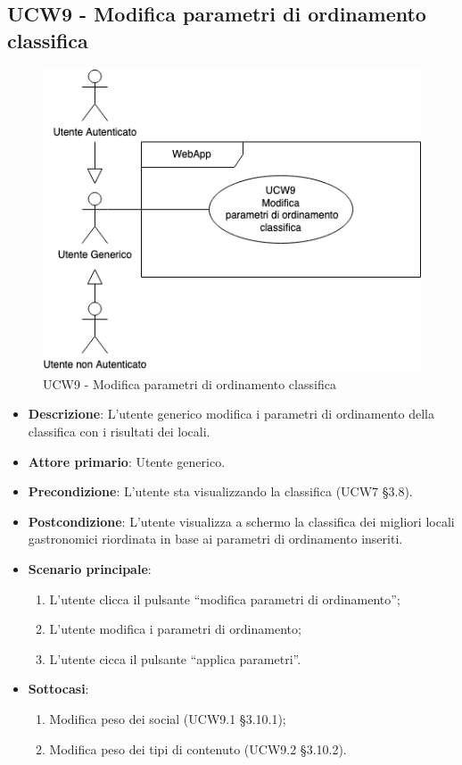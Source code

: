 \subsection{UCW9 - Modifica parametri di ordinamento classifica}
\begin{figure}[!h]
\centering
    \includegraphics[scale=0.5]{UC_images/UCW9.png}
    \caption{UCW9 - Modifica parametri di ordinamento classifica}
\end{figure}
\begin{itemize}
	\item \textbf{Descrizione}: L'utente generico modifica i parametri di ordinamento della classifica con i risultati dei locali.
    \item \textbf{Attore primario}: Utente generico.
    \item \textbf{Precondizione}: L’utente sta visualizzando la classifica (UCW7 §3.8).
    \item \textbf{Postcondizione}: L’utente visualizza a schermo la classifica dei migliori locali gastronomici riordinata in base ai parametri di ordinamento inseriti.
    \item \textbf{Scenario principale}: 
    \begin{enumerate}
        \item L’utente clicca il pulsante “modifica parametri di ordinamento”;
        \item L’utente modifica i parametri di ordinamento;
        \item L’utente cicca il pulsante “applica parametri”.
    \end{enumerate}

    \item \textbf{Sottocasi}:
    \begin{enumerate}
        \item Modifica peso dei social (UCW9.1 §3.10.1);
        \item Modifica peso dei tipi di contenuto (UCW9.2 §3.10.2).
    \end{enumerate}

\end{itemize}

